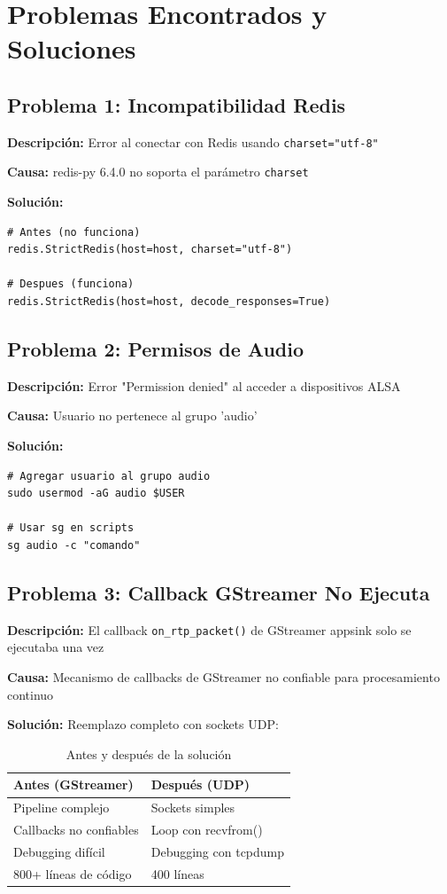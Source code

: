 \documentclass[12pt,a4paper]{article}
\begin{document}
\newpage

\section{Problemas Encontrados y Soluciones}

\subsection{Problema 1: Incompatibilidad Redis}

\textbf{Descripción:} Error al conectar con Redis usando \texttt{charset="utf-8"}

\textbf{Causa:} redis-py 6.4.0 no soporta el parámetro \texttt{charset}

\textbf{Solución:}
\begin{lstlisting}[style=pythonstyle]
# Antes (no funciona)
redis.StrictRedis(host=host, charset="utf-8")

# Despues (funciona)
redis.StrictRedis(host=host, decode_responses=True)
\end{lstlisting}

\subsection{Problema 2: Permisos de Audio}

\textbf{Descripción:} Error "Permission denied" al acceder a dispositivos ALSA

\textbf{Causa:} Usuario no pertenece al grupo 'audio'

\textbf{Solución:}
\begin{lstlisting}[style=bashstyle]
# Agregar usuario al grupo audio
sudo usermod -aG audio $USER

# Usar sg en scripts
sg audio -c "comando"
\end{lstlisting}

\subsection{Problema 3: Callback GStreamer No Ejecuta}

\textbf{Descripción:} El callback \texttt{on\_rtp\_packet()} de GStreamer appsink solo se ejecutaba una vez

\textbf{Causa:} Mecanismo de callbacks de GStreamer no confiable para procesamiento continuo

\textbf{Solución:} Reemplazo completo con sockets UDP:

\begin{table}[H]
\centering
\caption{Antes y después de la solución}
\begin{tabular}{@{}ll@{}}
\toprule
\textbf{Antes (GStreamer)} & \textbf{Después (UDP)} \\ \midrule
Pipeline complejo & Sockets simples \\
Callbacks no confiables & Loop con recvfrom() \\
Debugging difícil & Debugging con tcpdump \\
800+ líneas de código & 400 líneas \\
\bottomrule
\end{tabular}
\end{table}
\end{document}
